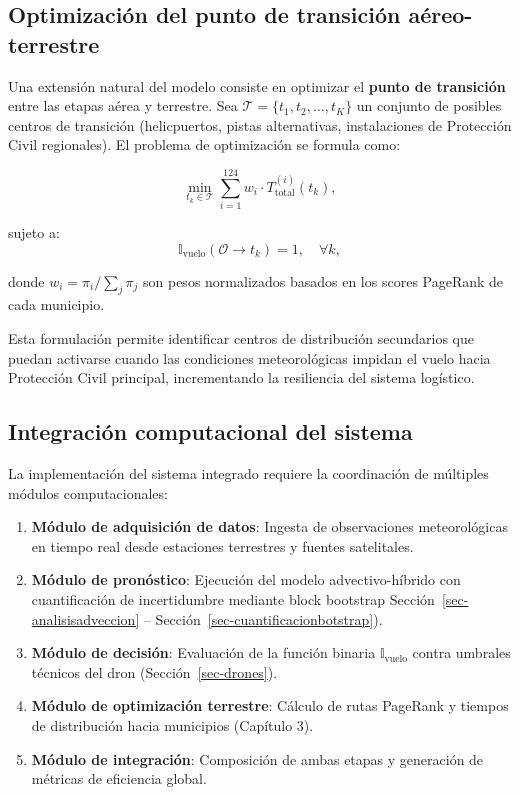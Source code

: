 \documentclass[
  spanish,
  us-letterpaper,
]{scrreprt}
\numberwithin{equation}{section}
\begin{document}
\subsection{Optimización del punto de transición
aéreo-terrestre}\label{optimizaciuxf3n-del-punto-de-transiciuxf3n-auxe9reo-terrestre}

Una extensión natural del modelo consiste en optimizar el \textbf{punto
de transición} entre las etapas aérea y terrestre. Sea
\(\mathcal{T} = \{t_1, t_2, \dots, t_K\}\) un conjunto de posibles
centros de transición (helicpuertos, pistas alternativas, instalaciones
de Protección Civil regionales). El problema de optimización se formula
como:

\[
\min_{t_k \in \mathcal{T}} \sum_{i=1}^{124} w_i \cdot T_{\text{total}}^{(i)}(t_k),
\]

sujeto a: \[
\mathbb{I}_{\text{vuelo}}(\mathcal{O} \to t_k) = 1, \quad \forall k,
\]

donde \(w_i = \pi_i / \sum_j \pi_j\) son pesos normalizados basados en
los scores PageRank de cada municipio.

Esta formulación permite identificar centros de distribución secundarios
que puedan activarse cuando las condiciones meteorológicas impidan el
vuelo hacia Protección Civil principal, incrementando la resiliencia del
sistema logístico.

\subsection{Integración computacional del
sistema}\label{integraciuxf3n-computacional-del-sistema}

La implementación del sistema integrado requiere la coordinación de
múltiples módulos computacionales:

\begin{enumerate}
\def\labelenumi{\arabic{enumi}.}
\item
  \textbf{Módulo de adquisición de datos}: Ingesta de observaciones
  meteorológicas en tiempo real desde estaciones terrestres y fuentes
  satelitales.
\item
  \textbf{Módulo de pronóstico}: Ejecución del modelo advectivo-híbrido
  con cuantificación de incertidumbre mediante block bootstrap
  Sección~\ref{sec-analisisadveccion} --
  Sección~\ref{sec-cuantificacionbotstrap}).
\item
  \textbf{Módulo de decisión}: Evaluación de la función binaria
  \(\mathbb{I}_{\text{vuelo}}\) contra umbrales técnicos del dron
  (Sección~\ref{sec-drones}).
\item
  \textbf{Módulo de optimización terrestre}: Cálculo de rutas PageRank y
  tiempos de distribución hacia municipios (Capítulo 3).
\item
  \textbf{Módulo de integración}: Composición de ambas etapas y
  generación de métricas de eficiencia global.
\end{enumerate}
\end{document}
